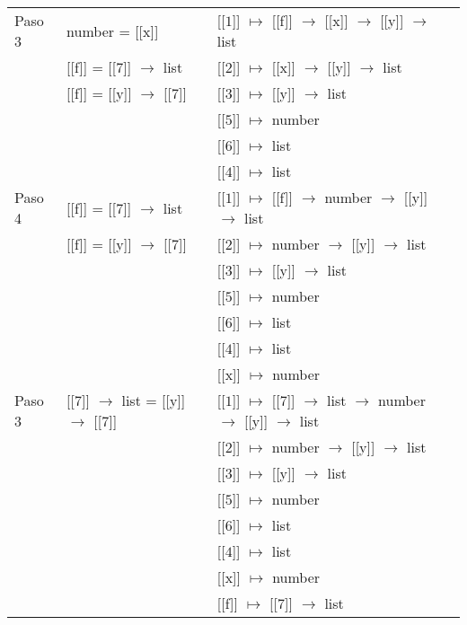 \documentclass{article}
\begin{document}
\begin{center}
\begin{longtable}{ | l | p{10 cm} | p{5 cm} | }
 Paso 3  & number = [[x]]  					& [[$\boxed{1}$]] $\mapsto$ [[f]] $\rightarrow$ [[x]] $\rightarrow$ [[y]] $\rightarrow$ list \\
	 & [[f]] = [[$\boxed{7}$]] $\rightarrow$ list		& [[$\boxed{2}$]] $\mapsto$ [[x]] $\rightarrow$ [[y]] $\rightarrow$ list \\
	 & [[f]] = [[y]] $\rightarrow$ [[$\boxed{7}$]] 		& [[$\boxed{3}$]] $\mapsto$ [[y]] $\rightarrow$ list \\
	 &	& [[$\boxed{5}$]] $\mapsto$ number \\
	 &	& [[$\boxed{6}$]] $\mapsto$ list \\ 
	 &	& [[$\boxed{4}$]] $\mapsto$ list \\ \hline
 
 Paso 4  & [[f]] = [[$\boxed{7}$]] $\rightarrow$ list		& [[$\boxed{1}$]] $\mapsto$ [[f]] $\rightarrow$ number $\rightarrow$ [[y]] $\rightarrow$ list \\
	 & [[f]] = [[y]] $\rightarrow$ [[$\boxed{7}$]] 		& [[$\boxed{2}$]] $\mapsto$ number $\rightarrow$ [[y]] $\rightarrow$ list \\
	 &	& [[$\boxed{3}$]] $\mapsto$ [[y]] $\rightarrow$ list \\
	 &	& [[$\boxed{5}$]] $\mapsto$ number \\
	 &	& [[$\boxed{6}$]] $\mapsto$ list \\ 
	 &	& [[$\boxed{4}$]] $\mapsto$ list \\ 
	 &	& [[x]] $\mapsto$ number \\ \hline
 
 Paso 3  & [[$\boxed{7}$]] $\rightarrow$ list = [[y]] $\rightarrow$ [[$\boxed{7}$]] 		& [[$\boxed{1}$]] $\mapsto$ [[$\boxed{7}$]] $\rightarrow$ list $\rightarrow$ number $\rightarrow$ [[y]] $\rightarrow$ list \\
	 &	& [[$\boxed{2}$]] $\mapsto$ number $\rightarrow$ [[y]] $\rightarrow$ list \\
	 &	& [[$\boxed{3}$]] $\mapsto$ [[y]] $\rightarrow$ list \\
	 &	& [[$\boxed{5}$]] $\mapsto$ number \\
	 &	& [[$\boxed{6}$]] $\mapsto$ list \\ 
	 &	& [[$\boxed{4}$]] $\mapsto$ list \\ 
	 &	& [[x]] $\mapsto$ number \\ 
	 &	& [[f]] $\mapsto$ [[$\boxed{7}$]] $\rightarrow$ list \\ \hline
 

\end{longtable}
\end{center}
\end{document}
